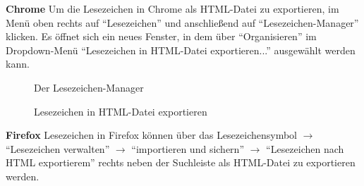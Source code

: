 \textbf{Chrome}%
\newline Um die Lesezeichen in Chrome als HTML-Datei zu exportieren, im Menü oben rechts auf \enquote{Lesezeichen} und anschließend auf \enquote{Lesezeichen-Manager} klicken. Es öffnet sich ein neues Fenster, in dem über \enquote{Organisieren} im Dropdown-Menü \enquote{Lesezeichen in HTML-Datei exportieren...} ausgewählt werden kann.  
\begin{figure}[h!]
 \centering
 \caption{Der Lesezeichen-Manager}
 \label{fig:lesezeichenManager}
\end{figure}
\begin{figure}[ht]
 \centering
 \caption{Lesezeichen in HTML-Datei exportieren}
 \label{fig:lesezeichenHtmlExportieren}
\end{figure}

\textbf{Firefox}
\newline Lesezeichen in Firefox können über das Lesezeichensymbol $\to$ \enquote{Lesezeichen verwalten} $\to$ \enquote{importieren und sichern} $\to$ \enquote{Lesezeichen nach HTML exportierem} rechts neben der Suchleiste als HTML-Datei zu exportieren werden.

